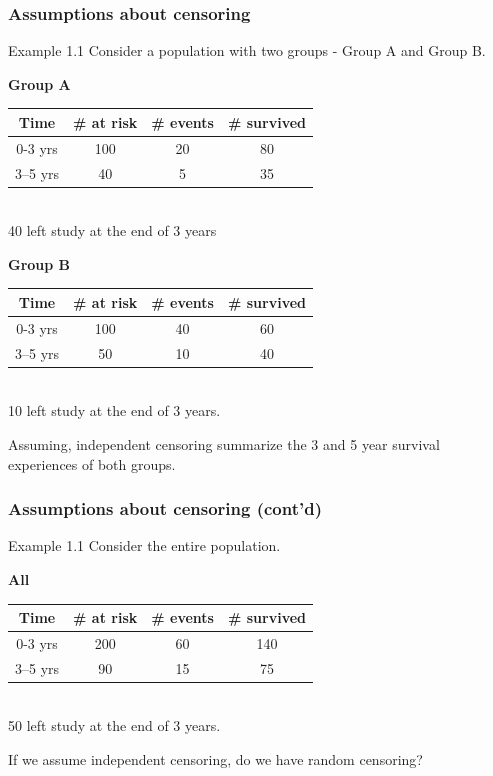 \documentclass{beamer}
\theoremstyle{definition}
\begin{document}
\begin{frame}
\frametitle{Assumptions about censoring}
\begin{block}{Example 1.1}
Consider a population with two groups - Group A and Group B.
\begin{center}
\textbf{Group A}
\begin{tabular}{ c c c c }
 Time & \# at risk & \# events & \# survived \\ \hline
 0-3 yrs & 100 & 20 & 80 \\
 3–5 yrs &  40 & 5 & 35
\end{tabular} \\
40 left study at the end of 3 years
\end{center}
\begin{center}
\textbf{Group B}
\begin{tabular}{ c c c c }
 Time & \# at risk & \# events & \# survived \\ \hline
 0-3 yrs & 100 & 40 & 60 \\
 3–5 yrs &  50 & 10 & 40
\end{tabular} \\
10 left study at the end of 3 years.
\end{center}
\end{block}
Assuming, independent censoring summarize the 3 and 5 year survival experiences of both groups.
\end{frame}

\begin{frame} 
\frametitle{Assumptions about censoring (cont'd)} 
\begin{block}{Example 1.1} 
Consider the entire population.
\begin{center} 
\textbf{All} 
\begin{tabular}{ c c c c }
 Time & \# at risk & \# events & \# survived \\ \hline
 0-3 yrs & 200 & 60 & 140 \\
 3–5 yrs &  90 & 15 & 75
\end{tabular} \\
50 left study at the end of 3 years.
\end{center} 
\end{block} 
If we assume independent censoring, do we have random censoring? 
\end{frame} 
\end{document}
